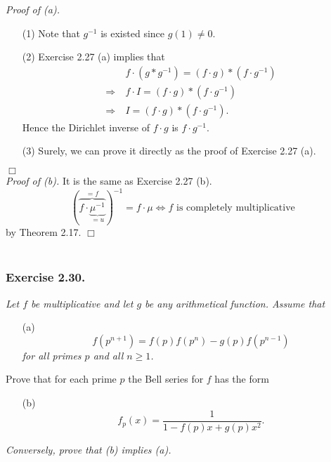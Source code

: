 \documentclass{article}
\begin{document}
\emph{Proof of (a).}
\begin{enumerate}
\item[(1)]
  Note that $g^{-1}$ is existed since $g(1) \neq 0$.

\item[(2)]
  Exercise 2.27 (a) implies that
  \begin{align*}
    & \: f \cdot (g * g^{-1}) = (f \cdot g) * (f \cdot g^{-1}) \\
    \Longrightarrow & \:
    f \cdot I = (f \cdot g) * (f \cdot g^{-1}) \\
    \Longrightarrow & \:
    I = (f \cdot g) * (f \cdot g^{-1}).
  \end{align*}
  Hence the Dirichlet inverse of $f \cdot g$ is $f \cdot g^{-1}$.

\item[(3)]
  Surely, we can prove it directly as the proof of Exercise 2.27 (a).
\end{enumerate}
$\Box$ \\



\emph{Proof of (b).}
  It is the same as Exercise 2.27 (b).
  \[
    (\overbrace{f \cdot \underbrace{\mu^{-1}}_{= u}}^{=f})^{-1} = f \cdot \mu
    \Longleftrightarrow
    \text{$f$ is completely multiplicative}
  \]
  by Theorem 2.17.
$\Box$ \\\\









\subsubsection*{Exercise 2.30.}
\emph{Let $f$ be multiplicative and let $g$ be any arithmetical function.
Assume that}
\begin{enumerate}
\item[(a)]
  \emph{
  \[
    f(p^{n+1}) = f(p)f(p^n) - g(p)f(p^{n-1})
  \]
  for all primes $p$ and all $n \geq 1$.}
\end{enumerate}
Prove that for each prime $p$ the Bell series for $f$ has the form
\begin{enumerate}
\item[(b)]
  \[
    f_p(x) = \frac{1}{1 - f(p)x + g(p)x^2}.
  \]
\end{enumerate}
\emph{Conversely, prove that (b) implies (a).} \\
\end{document}
